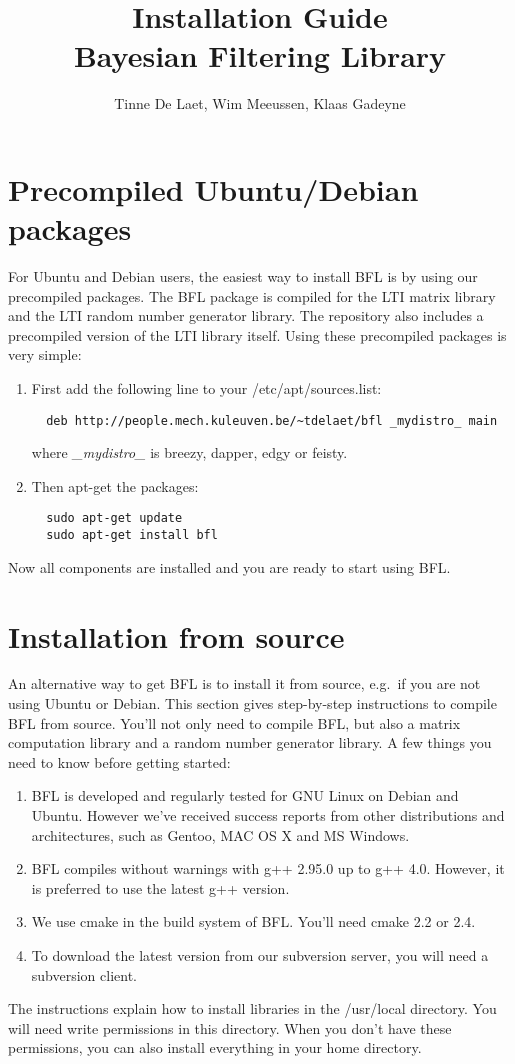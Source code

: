 \documentclass[a4paper,10pt]{article}
\title{Installation Guide \\  Bayesian Filtering Library}
\author{Tinne De Laet, Wim Meeussen, Klaas Gadeyne}
\begin{document}
\maketitle



\section{Precompiled Ubuntu/Debian packages}
\label{sec:ubuntu}
For Ubuntu and Debian users, the easiest way to install BFL is by
using our precompiled packages.  The BFL package is compiled for the
LTI matrix library and the LTI random number generator library.  The
repository also includes a precompiled version of the LTI library
itself.  Using these precompiled packages is very simple:
\begin{enumerate}
\item First add the following line to your /etc/apt/sources.list:
\begin{verbatim}
  deb http://people.mech.kuleuven.be/~tdelaet/bfl _mydistro_ main
\end{verbatim}
  where \emph{\_mydistro\_} is breezy, dapper, edgy or feisty.
\item Then apt-get the packages:
\begin{verbatim}
  sudo apt-get update
  sudo apt-get install bfl
\end{verbatim}
\end{enumerate}
Now all components are installed and you are ready to start using BFL.




\section{Installation from source}
An alternative way to get BFL is to install it from source, e.g.~if
you are not using Ubuntu or Debian. This section gives step-by-step
instructions to compile BFL from source. You'll not only need to
compile BFL, but also a matrix computation library and a random number
generator library. A few things you need to know before getting
started:
\begin{enumerate}
\item BFL is developed and regularly tested for GNU Linux on
  Debian and Ubuntu. However we've received success reports from other
  distributions and architectures, such as Gentoo, MAC OS X and MS
  Windows.
\item BFL compiles without warnings with g++ 2.95.0 up to g++ 4.0.
  However, it is preferred to use the latest g++ version.
\item We use cmake in the build system of BFL. You'll need cmake 2.2
  or 2.4.
\item To download the latest version from our subversion server, you
  will need a subversion client.
\end{enumerate}
The instructions explain how to install libraries in the /usr/local
directory. You will need write permissions in this directory. When you
don't have these permissions, you can also install everything in your
home directory.
\end{document}

